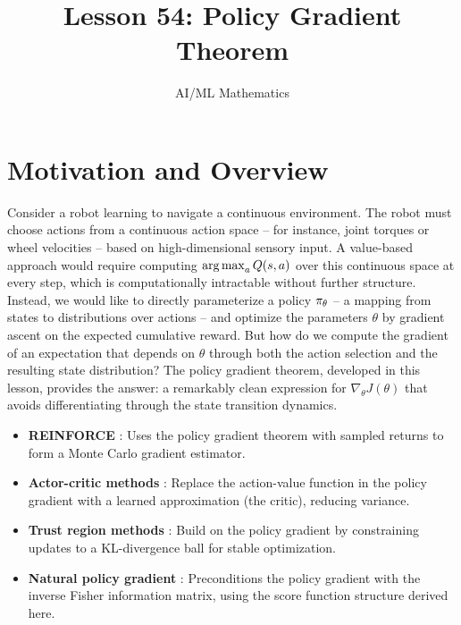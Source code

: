 \documentclass[11pt,a4paper]{article}
\title{Lesson 54: Policy Gradient Theorem}
\author{AI/ML Mathematics}
\date{}
\begin{document}
\maketitle
\tableofcontents
\newpage

\section{Motivation and Overview}

Consider a robot learning to navigate a continuous environment. The robot
must choose actions from a continuous action space -- for instance, joint
torques or wheel velocities -- based on high-dimensional sensory input. A
value-based approach would require computing
$\operatorname{arg\,max}_a Q(s,a)$ over this continuous space at every step, which is
computationally intractable without further structure. Instead, we would
like to directly parameterize a policy $\pi_\theta$ -- a mapping from
states to distributions over actions -- and optimize the parameters $\theta$
by gradient ascent on the expected cumulative reward. But how do we
compute the gradient of an expectation that depends on $\theta$ through both
the action selection and the resulting state distribution? The policy
gradient theorem, developed in this lesson, provides the answer: a
remarkably clean expression for $\nabla_\theta J(\theta)$ that avoids
differentiating through the state transition dynamics.

\begin{rlconnection}
\begin{itemize}
  \item \textbf{REINFORCE} \citep{williams1992}: Uses the policy gradient
    theorem with sampled returns to form a Monte Carlo gradient estimator.
  \item \textbf{Actor-critic methods} \citep{konda2003}: Replace the
    action-value function in the policy gradient with a learned
    approximation (the critic), reducing variance.
  \item \textbf{Trust region methods} \citep{schulman2015trpo}: Build on
    the policy gradient by constraining updates to a KL-divergence ball
    for stable optimization.
  \item \textbf{Natural policy gradient} \citep{kakade2002}: Preconditions
    the policy gradient with the inverse Fisher information matrix, using
    the score function structure derived here.
\end{itemize}
\end{rlconnection}
\end{document}
